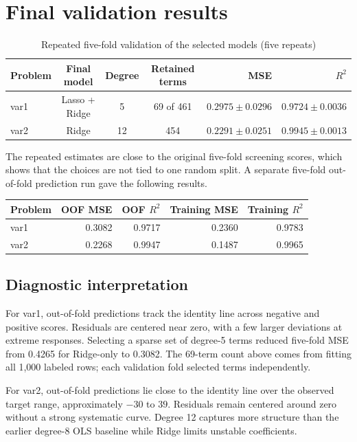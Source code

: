 \documentclass[10pt,a4paper]{article}
\begin{document}
\newpage\thispagestyle{fancy}
\section{Final validation results}

\begin{table}[h]
\centering
\caption{Repeated five-fold validation of the selected models (five repeats)}
\begin{tabular}{lcccrr}
\toprule
Problem & Final model & Degree & Retained terms & MSE & $R^2$ \\
\midrule
var1 & Lasso + Ridge & 5 & 69 of 461 & $0.2975 \pm 0.0296$ & $0.9724 \pm 0.0036$ \\
var2 & Ridge & 12 & 454 & $0.2291 \pm 0.0251$ & $0.9945 \pm 0.0013$ \\
\bottomrule
\end{tabular}
\end{table}

The repeated estimates are close to the original five-fold screening scores, which shows that the choices are not tied to one random split. A separate five-fold out-of-fold prediction run gave the following results.

\begin{table}[h]
\centering
{}
\begin{tabular}{lrrrr}
\toprule
Problem & OOF MSE & OOF $R^2$ & Training MSE & Training $R^2$ \\
\midrule
var1 & 0.3082 & 0.9717 & 0.2360 & 0.9783 \\
var2 & 0.2268 & 0.9947 & 0.1487 & 0.9965 \\
\bottomrule
\end{tabular}
\end{table}

\subsection{Diagnostic interpretation}
For var1, out-of-fold predictions track the identity line across negative and positive scores. Residuals are centered near zero, with a few larger deviations at extreme responses. Selecting a sparse set of degree-5 terms reduced five-fold MSE from 0.4265 for Ridge-only to 0.3082. The 69-term count above comes from fitting all 1,000 labeled rows; each validation fold selected terms independently.

For var2, out-of-fold predictions lie close to the identity line over the observed target range, approximately $-30$ to $39$. Residuals remain centered around zero without a strong systematic curve. Degree 12 captures more structure than the earlier degree-8 OLS baseline while Ridge limits unstable coefficients.
\end{document}
